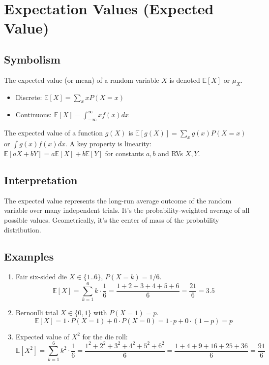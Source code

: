 \documentclass{article}
\newcommand{\E}{\mathbb{E}}    %
\begin{document}
\section{Expectation Values (Expected Value)}

\subsection*{Symbolism}
The expected value (or mean) of a random variable $X$ is denoted $\E[X]$ or $\mu_X$.
\begin{itemize}
    \item Discrete: $\E[X] = \sum_x x P(X=x)$
    \item Continuous: $\E[X] = \int_{-\infty}^{\infty} x f(x) dx$
\end{itemize}
The expected value of a function $g(X)$ is $\E[g(X)] = \sum_x g(x) P(X=x)$ or $\int g(x) f(x) dx$.
A key property is linearity: $\E[aX + bY] = a\E[X] + b\E[Y]$ for constants $a, b$ and RVs $X, Y$.

\subsection*{Interpretation}
The expected value represents the long-run average outcome of the random variable over many independent trials. It's the probability-weighted average of all possible values. Geometrically, it's the center of mass of the probability distribution.

\subsection*{Examples}
\begin{enumerate}
    \item Fair six-sided die $X \in \{1..6\}$, $P(X=k)=1/6$.
    \[ \E[X] = \sum_{k=1}^6 k \cdot \frac{1}{6} = \frac{1+2+3+4+5+6}{6} = \frac{21}{6} = 3.5 \]
    \item Bernoulli trial $X \in \{0, 1\}$ with $P(X=1)=p$.
    \[ \E[X] = 1 \cdot P(X=1) + 0 \cdot P(X=0) = 1 \cdot p + 0 \cdot (1-p) = p \]
    \item Expected value of $X^2$ for the die roll:
    \[ \E[X^2] = \sum_{k=1}^6 k^2 \cdot \frac{1}{6} = \frac{1^2+2^2+3^2+4^2+5^2+6^2}{6} = \frac{1+4+9+16+25+36}{6} = \frac{91}{6} \]
\end{enumerate}

\end{document}
